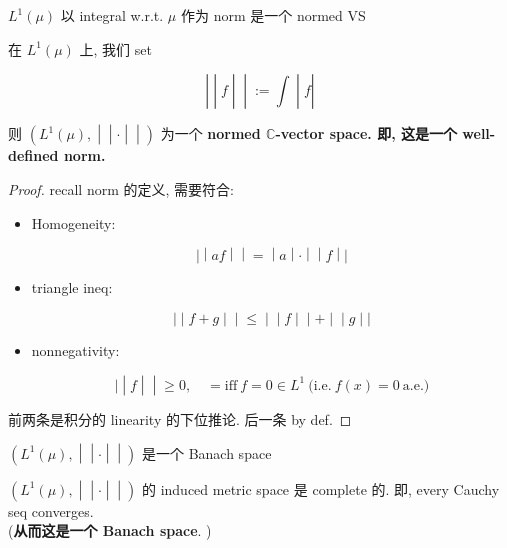 \documentclass{qlnotes-export}
\begin{document}
\begin{theorem}{\(L^{1}(\mu)\) 以 integral w.r.t. \(\mu\) 作为 norm 是一个 normed VS}\label{thm-05-integration-of-real-and-complex-functions-l-1-mu-integral-w-r-t-mu-norm-normed-vs}

在 \(L^{1}(\mu)\) 上, 我们 set

\[\left. | \middle| f \middle| \middle| := \int \middle| f| \right.\]

则 \(\left. (L^{1}(\mu), \middle| \middle| \cdot \middle| \middle| ) \right.\) 为一个 \textbf{normed \(\mathbb{C}\)-vector space. 即, 这是一个 well-defined norm.}

\end{theorem}

\begin{proof}

recall norm 的定义, 需要符合:

\begin{itemize}
\item
  Homogeneity:

  \[\left. | \middle| af \middle| \middle| = \middle| a \middle| \cdot \middle| \middle| f \middle| | \right.\]
\item
  triangle ineq:

  \[\left. | \middle| f + g \middle| \middle| \leq \middle| \middle| f \middle| \middle| + \middle| \middle| g \middle| | \right.\]
\item
  nonnegativity:

  \[\left. | \middle| f \middle| \middle| \geq 0,\quad = \text{iff}\ f = 0 \in L^{1}\ \text{(i.e.}\ f(x) = 0\ \text{a.e.)} \right.\]
\end{itemize}

前两条是积分的 linearity 的下位推论. 后一条 by def.

\end{proof}

\begin{corollary}{\(\left. (L^{1}(\mu), \middle| \middle| \cdot \middle| \middle| ) \right.\)
是一个 Banach space}\label{cor-05-integration-of-real-and-complex-functions-l-1-mu-cdot-banach-space}

\(\left. (L^{1}(\mu), \middle| \middle| \cdot \middle| \middle| ) \right.\) 的 induced metric space 是 complete 的. 即, every Cauchy seq converges.\\
(\textbf{从而这是一个 Banach space}. )

\end{corollary}
\end{document}
